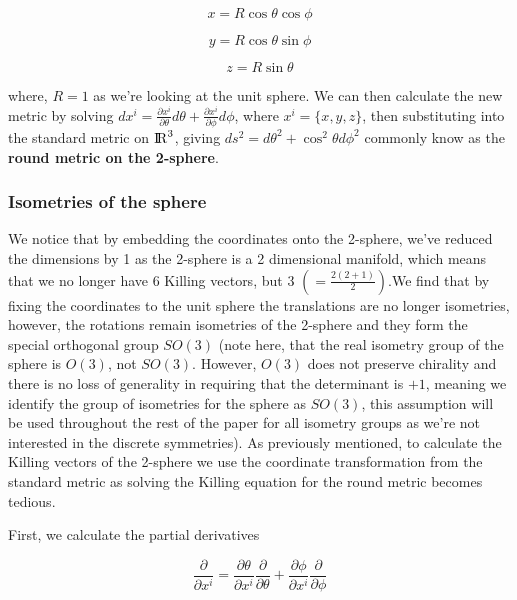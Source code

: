 \documentclass[a4paper,11pt]{article}
\numberwithin{equation}{section}
\numberwithin{figure}{section}
\begin{document}
\begin{large}
\begin{equation}
\label{eq:xpol}
    x=R\cos\theta\cos\phi 
\end{equation}

\begin{equation}
\label{eq:ypol}
    y=R\cos\theta\sin\phi 
\end{equation}

\begin{equation}
\label{eq:zpol}
    z=R\sin\theta
\end{equation}


where, $R=1$ as we're looking at the unit sphere. We can then calculate the new metric by solving $dx^i=\frac{\partial x^i}{\partial \theta}d\theta+\frac{\partial x^i}{\partial \phi}d\phi$, where $x^i=\{x,y,z\}$, then substituting into the standard metric on ${\rm I\!R}^3$, giving $ds^2=d\theta^2+\cos^2\theta d\phi^2$ commonly know as the \textbf{round metric on the 2-sphere}.

\subsubsection{Isometries of the sphere}


We notice that by embedding the coordinates onto the 2-sphere, we've reduced the dimensions by 1 as the 2-sphere is a 2 dimensional manifold, which means that we no longer have 6 Killing vectors, but $3$ $\left(=\frac{2(2+1)}{2}\right)$.We find that by fixing the coordinates to the unit sphere the translations are no longer isometries, however, the rotations remain isometries of the 2-sphere and they form the special orthogonal group $SO(3)$ (note here, that the real isometry group of the sphere is $O(3)$, not $SO(3)$. However, $O(3)$ does not preserve chirality and there is no loss of generality in requiring that the determinant is $+1$, meaning we identify the group of isometries for the sphere as $SO(3)$, this assumption will be used throughout the rest of the paper for all isometry groups as we're not interested in the discrete symmetries). As previously mentioned, to calculate the Killing vectors of the 2-sphere we use the coordinate transformation from the standard metric as solving the Killing equation for the round metric becomes tedious. 

First, we calculate the partial derivatives

\begin{equation}
\label{eq:part}
    \frac{\partial}{\partial x^i}=\frac{\partial \theta}{\partial x^i}\frac{\partial}{\partial \theta}+\frac{\partial \phi}{\partial x^i}\frac{\partial}{\partial \phi}
\end{equation}


\end{large}
\end{document}
